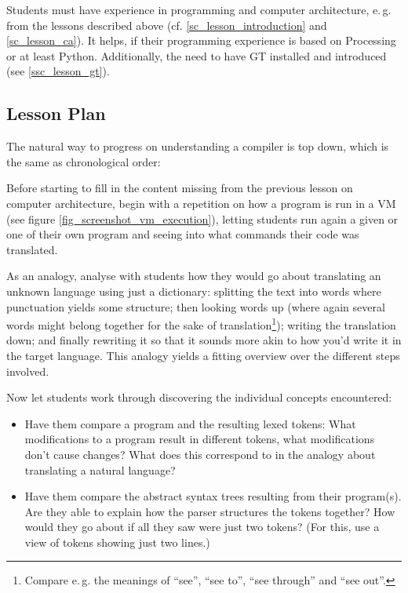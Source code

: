 Students must have experience in programming and computer architecture, e.\,g. from the lessons described above (cf. \ref{sc_lesson_introduction} and \ref{sc_lesson_ca}). It helps, if their programming experience is based on Processing or at least Python. Additionally, the need to have \ac{GT} installed and introduced (see \ref{ssc_lesson_gt}).


\subsection{Lesson Plan}

The natural way to progress on understanding a compiler is top down, which is the same as chronological order:

\begin{instructions}
\item Before starting to fill in the content missing from the previous lesson on computer architecture, begin with a repetition on how a program is run in a \ac{VM} (see figure \ref{fig_screenshot_vm_execution}), letting students run again a given or one of their own program and seeing into what commands their code was translated.
\item As an analogy, analyse with students how they would go about translating an unknown language using just a dictionary: splitting the text into words where punctuation yields some structure; then looking words up (where again several words might belong together for the sake of translation\footnote{Compare e.\,g. the meanings of ``see'', ``see to'', ``see through'' and ``see out''.}); writing the translation down; and finally rewriting it so that it sounds more akin to how you'd write it in the target language. This analogy yields a fitting overview over the different steps involved.
\item Now let students work through discovering the individual concepts encountered:
\begin{itemize}
\item Have them compare a program and the resulting lexed tokens: What modifications to a program result in different tokens, what modifications don't cause changes? What does this correspond to in the analogy about translating a natural language?
\item Have them compare the abstract syntax trees resulting from their program(s). Are they able to explain how the parser structures the tokens together? How would they go about if all they saw were just two tokens? (For this, use a view of tokens showing just two lines.)

\end{itemize}
\end{instructions}
